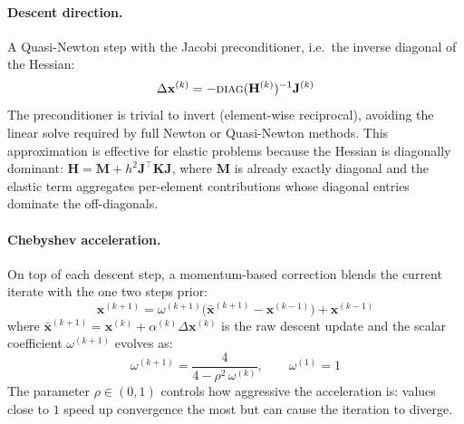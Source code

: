 \documentclass{article}
\begin{document}
\paragraph{Descent direction.}
A Quasi-Newton step with the Jacobi preconditioner, i.e.\ the inverse diagonal of the Hessian:
\begin{equation}
    \Delta\mathbf{x}^{(k)} = -\textsc{diag}(\mathbf{H}^{(k)})^{-1}\mathbf{J}^{(k)}
\end{equation}
The preconditioner is trivial to invert (element-wise reciprocal), avoiding the linear solve required by full Newton or Quasi-Newton methods. This approximation is effective for elastic problems because the Hessian is diagonally dominant: $\mathbf{H} = \mathbf{M} + h^2 \mathbf{J}^\top\mathbf{K}\mathbf{J}$, where $\mathbf{M}$ is already exactly diagonal and the elastic term aggregates per-element contributions whose diagonal entries dominate the off-diagonals.

\paragraph{Chebyshev acceleration.}
On top of each descent step, a momentum-based correction blends the current iterate with the one two steps prior:
\begin{equation}
    \mathbf{x}^{(k+1)} = \omega^{(k+1)}\bigl(\bar{\mathbf{x}}^{(k+1)} - \mathbf{x}^{(k-1)}\bigr) + \mathbf{x}^{(k-1)}
\end{equation}
where $\bar{\mathbf{x}}^{(k+1)} = \mathbf{x}^{(k)} + \alpha^{(k)}\Delta\mathbf{x}^{(k)}$ is the raw descent update and the scalar coefficient $\omega^{(k+1)}$ evolves as:
\begin{equation}
    \omega^{(k+1)} = \frac{4}{4 - \rho^2\,\omega^{(k)}}, \qquad \omega^{(1)} = 1
\end{equation}
The parameter $\rho \in (0,1)$ controls how aggressive the acceleration is: values close to $1$ speed up convergence the most but can cause the iteration to diverge. 

\end{document}
